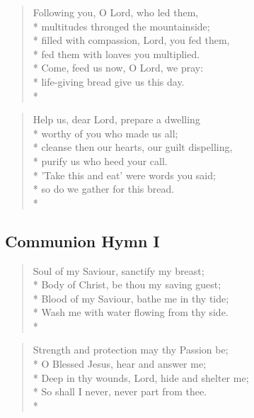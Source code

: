 \documentclass[12pt]{article}
\newcounter{count}
\newcommand\printcount{\addtocounter{count}{1}\thecount}
\begin{document}
\begin{multicols}{2}
\begin{verse}
\flagverse{\printcount.} Following you, O Lord, who led them,\\*
multitudes thronged the mountainside;\\*
filled with compassion, Lord, you fed them,\\*
fed them with loaves you multiplied.\\*
Come, feed us now, O Lord, we pray:\\*
life-giving bread give us this day.\\*
\end{verse}

\begin{verse}
\flagverse{\printcount.} Help us, dear Lord, prepare a dwelling\\*
worthy of you who made us all;\\*
cleanse then our hearts, our guilt dispelling,\\*
purify us who heed your call.\\*
'Take this and eat' were words you said;\\*
so do we gather for this bread.\\*
\end{verse}
\end{multicols}

\begin{center}
\subsection*{Communion Hymn I}
\end{center}
\begin{multicols}{2}
\setcounter{count}{0}
\setcounter{count}{0}
\begin{verse}
\flagverse{\printcount.} Soul of my Saviour, sanctify my breast;\\*
Body of Christ, be thou my saving guest;\\*
Blood of my Saviour, bathe me in thy tide;\\*
Wash me with water flowing from thy side.\\*
\end{verse}

\begin{verse}
\flagverse{\printcount.} Strength and protection may thy Passion be;\\*
O Blessed Jesus, hear and answer me;\\*
Deep in thy wounds, Lord, hide and shelter me;\\*
So shall I never, never part from thee.\\*
\end{verse}
\end{multicols}
\end{document}
